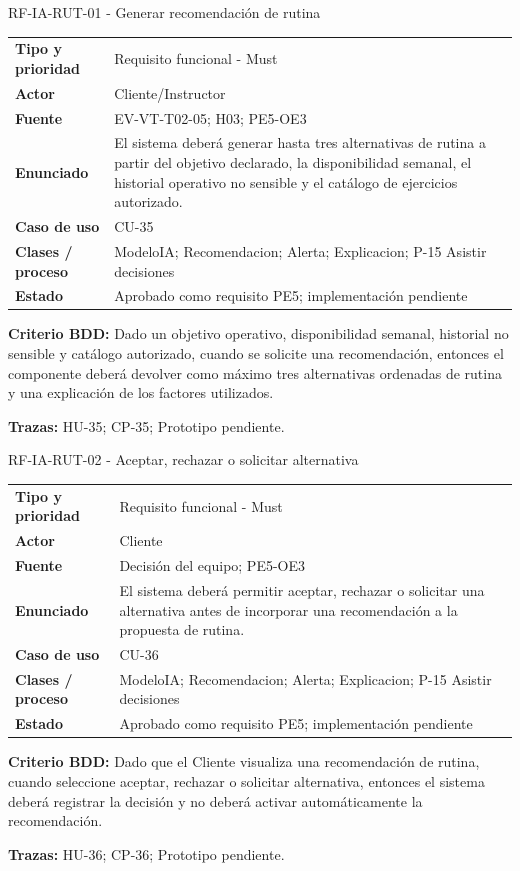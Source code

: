 \begin{reqbox}{RF-IA-RUT-01 - Generar recomendación de rutina}
\begin{tabularx}{\textwidth}{>{\bfseries}p{3.2cm}Y}
Tipo y prioridad & Requisito funcional - Must \\
Actor & Cliente/Instructor \\
Fuente & EV-VT-T02-05; H03; PE5-OE3 \\
Enunciado & El sistema deberá generar hasta tres alternativas de rutina a partir del objetivo declarado, la disponibilidad semanal, el historial operativo no sensible y el catálogo de ejercicios autorizado. \\
Caso de uso & CU-35 \\
Clases / proceso & ModeloIA; Recomendacion; Alerta; Explicacion; P-15 Asistir decisiones \\
Estado & Aprobado como requisito PE5; implementación pendiente \\
\end{tabularx}
\textbf{Criterio BDD:} Dado un objetivo operativo, disponibilidad semanal, historial no sensible y catálogo autorizado, cuando se solicite una recomendación, entonces el componente deberá devolver como máximo tres alternativas ordenadas de rutina y una explicación de los factores utilizados.

\textbf{Trazas:} HU-35; CP-35; Prototipo pendiente.
\end{reqbox}


\begin{reqbox}{RF-IA-RUT-02 - Aceptar, rechazar o solicitar alternativa}
\begin{tabularx}{\textwidth}{>{\bfseries}p{3.2cm}Y}
Tipo y prioridad & Requisito funcional - Must \\
Actor & Cliente \\
Fuente & Decisión del equipo; PE5-OE3 \\
Enunciado & El sistema deberá permitir aceptar, rechazar o solicitar una alternativa antes de incorporar una recomendación a la propuesta de rutina. \\
Caso de uso & CU-36 \\
Clases / proceso & ModeloIA; Recomendacion; Alerta; Explicacion; P-15 Asistir decisiones \\
Estado & Aprobado como requisito PE5; implementación pendiente \\
\end{tabularx}
\textbf{Criterio BDD:} Dado que el Cliente visualiza una recomendación de rutina, cuando seleccione aceptar, rechazar o solicitar alternativa, entonces el sistema deberá registrar la decisión y no deberá activar automáticamente la recomendación.

\textbf{Trazas:} HU-36; CP-36; Prototipo pendiente.
\end{reqbox}


